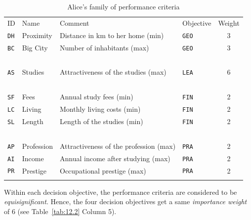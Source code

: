 \begin{table}[ht]
\caption{Alice's family of performance criteria}
\label{tab:12.2}       %
\begin{center}
    \begin{tabular}{l|l|l|l|c}
      \svhline\noalign{\smallskip}
      ID & Name & Comment & Objective & Weight\\
      \noalign{\smallskip}\hline\noalign{\smallskip}
       \texttt{DH}  & Proximity  &  Distance in km to her home (min)      &   \texttt{GEO}    &     3\\
       \texttt{BC}  & Big City   &  Number of inhabitants (max)           &   \texttt{GEO}    &     3\\
       \   & \          &  \                                     &   \      &     \ \\
       \texttt{AS}  & Studies    &  Attractiveness of the studies (max)   &   \texttt{LEA}    &     6\\
       \   & \          &  \                                     &  \       &    \ \\
       \texttt{SF}  & Fees       &  Annual study fees (min)               &   \texttt{FIN}    &     2\\
       \texttt{LC}  & Living     &  Monthly living costs (min)            &   \texttt{FIN}    &     2\\
       \texttt{SL}  & Length     &  Length of the studies (min)           &   \texttt{FIN}    &     2\\
       \   &  \         &   \                                    &   \      &     \ \\
       \texttt{AP}  & Profession &  Attractiveness of the profession (max)&   \texttt{PRA}    &     2\\
       \texttt{AI}  & Income     &  Annual income after studying (max)    &   \texttt{PRA}    &     2\\
       \texttt{PR}  & Prestige   &  Occupational prestige (max)           &   \texttt{PRA}    &     2\\
      \noalign{\smallskip}\hline
    \end{tabular}
\end{center}
\end{table}

Within each decision objective, the performance criteria are considered to be \emph{equisignificant}. Hence, the four decision objectives get a same \emph{importance weight} of $6$ (see Table~\vref{tab:12.2} Column 5).

